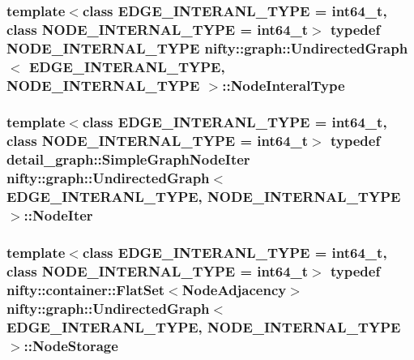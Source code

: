 \subsubsection[{Node\+Interal\+Type}]{\setlength{\rightskip}{0pt plus 5cm}template$<$class E\+D\+G\+E\+\_\+\+I\+N\+T\+E\+R\+A\+N\+L\+\_\+\+T\+Y\+P\+E = int64\+\_\+t, class N\+O\+D\+E\+\_\+\+I\+N\+T\+E\+R\+N\+A\+L\+\_\+\+T\+Y\+P\+E = int64\+\_\+t$>$ typedef N\+O\+D\+E\+\_\+\+I\+N\+T\+E\+R\+N\+A\+L\+\_\+\+T\+Y\+P\+E {\bf nifty\+::graph\+::\+Undirected\+Graph}$<$ E\+D\+G\+E\+\_\+\+I\+N\+T\+E\+R\+A\+N\+L\+\_\+\+T\+Y\+P\+E, N\+O\+D\+E\+\_\+\+I\+N\+T\+E\+R\+N\+A\+L\+\_\+\+T\+Y\+P\+E $>$\+::{\bf Node\+Interal\+Type}\hspace{0.3cm}{\ttfamily [protected]}}\label{classnifty_1_1graph_1_1UndirectedGraph_aa3b43dd44281416b7232caae529e8780}
\hypertarget{classnifty_1_1graph_1_1UndirectedGraph_aac54e4ad3a525489e9b29c1bd4c92c88}{}
\subsubsection[{Node\+Iter}]{\setlength{\rightskip}{0pt plus 5cm}template$<$class E\+D\+G\+E\+\_\+\+I\+N\+T\+E\+R\+A\+N\+L\+\_\+\+T\+Y\+P\+E = int64\+\_\+t, class N\+O\+D\+E\+\_\+\+I\+N\+T\+E\+R\+N\+A\+L\+\_\+\+T\+Y\+P\+E = int64\+\_\+t$>$ typedef {\bf detail\+\_\+graph\+::\+Simple\+Graph\+Node\+Iter} {\bf nifty\+::graph\+::\+Undirected\+Graph}$<$ E\+D\+G\+E\+\_\+\+I\+N\+T\+E\+R\+A\+N\+L\+\_\+\+T\+Y\+P\+E, N\+O\+D\+E\+\_\+\+I\+N\+T\+E\+R\+N\+A\+L\+\_\+\+T\+Y\+P\+E $>$\+::{\bf Node\+Iter}}\label{classnifty_1_1graph_1_1UndirectedGraph_aac54e4ad3a525489e9b29c1bd4c92c88}
\hypertarget{classnifty_1_1graph_1_1UndirectedGraph_a3a90ae1386fcc168216856934bf1ec24}{}
\subsubsection[{Node\+Storage}]{\setlength{\rightskip}{0pt plus 5cm}template$<$class E\+D\+G\+E\+\_\+\+I\+N\+T\+E\+R\+A\+N\+L\+\_\+\+T\+Y\+P\+E = int64\+\_\+t, class N\+O\+D\+E\+\_\+\+I\+N\+T\+E\+R\+N\+A\+L\+\_\+\+T\+Y\+P\+E = int64\+\_\+t$>$ typedef {\bf nifty\+::container\+::\+Flat\+Set}$<${\bf Node\+Adjacency}$>$ {\bf nifty\+::graph\+::\+Undirected\+Graph}$<$ E\+D\+G\+E\+\_\+\+I\+N\+T\+E\+R\+A\+N\+L\+\_\+\+T\+Y\+P\+E, N\+O\+D\+E\+\_\+\+I\+N\+T\+E\+R\+N\+A\+L\+\_\+\+T\+Y\+P\+E $>$\+::{\bf Node\+Storage}\hspace{0.3cm}{\ttfamily [protected]}}\label{classnifty_1_1graph_1_1UndirectedGraph_a3a90ae1386fcc168216856934bf1ec24}


